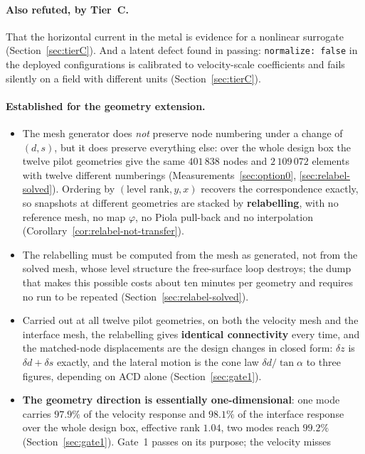 \documentclass[11pt,a4paper]{article}
\theoremstyle{plain}
\theoremstyle{definition}
\theoremstyle{remark}
\begin{document}
\paragraph{Also refuted, by Tier~C.}
That the horizontal current in the metal is evidence for a nonlinear surrogate
(Section~\ref{sec:tierC}). And a latent defect found in passing:
\texttt{normalize: false} in the deployed configurations is calibrated to
velocity-scale coefficients and fails silently on a field with different units
(Section~\ref{sec:tierC}).

\paragraph{Established for the geometry extension.}
\begin{itemize}\itemsep2pt
\item The mesh generator does \emph{not} preserve node numbering under a change
of $(d,s)$, but it does preserve everything else: over the whole design box the
twelve pilot geometries give the same $401\,838$ nodes and $2\,109\,072$
elements with twelve different numberings
(Measurements~\ref{sec:option0}, \ref{sec:relabel-solved}). Ordering by
$(\text{level rank}, y, x)$ recovers the correspondence exactly, so snapshots at
different geometries are stacked by \textbf{relabelling}, with no reference
mesh, no map $\varphi$, no Piola pull-back and no interpolation
(Corollary~\ref{cor:relabel-not-transfer}).
\item The relabelling must be computed from the mesh as generated, not from the
solved mesh, whose level structure the free-surface loop destroys; the dump that
makes this possible costs about ten minutes per geometry and requires no run to
be repeated (Section~\ref{sec:relabel-solved}).
\item Carried out at all twelve pilot geometries, on both the velocity mesh and
the interface mesh, the relabelling gives \textbf{identical connectivity} every
time, and the matched-node displacements are the design changes in closed form:
$\delta z$ is $\delta d + \delta s$ exactly, and the lateral motion is the cone
law $\delta d/\tan\alpha$ to three figures, depending on ACD alone
(Section~\ref{sec:gate1}).
\item \textbf{The geometry direction is essentially one-dimensional}: one mode
carries $97.9\%$ of the velocity response and $98.1\%$ of the interface response
over the whole design box, effective rank $1.04$, two modes reach $99.2\%$
(Section~\ref{sec:gate1}). Gate~1 passes on its purpose; the velocity misses

\end{itemize}
\end{document}
